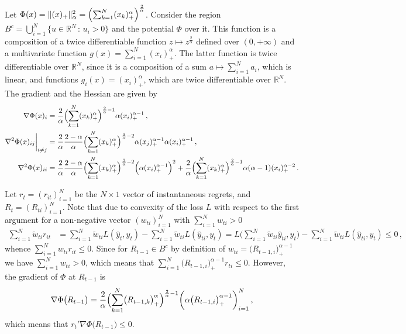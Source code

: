 \documentclass[a4paper]{article}
\newcommand{\Real}{\mathbb{R}}
\begin{document}
Let $\Phi(x) = \|(x)_+\|_\alpha^2 = \Bigl(\sum_{k=1}^N (x_k)_+^\alpha\Bigr)^\frac{2}{\alpha}$.
Consider the region $B^c=\bigcup_{i=1}^N \{u\in \Real^N\,:\, u_i > 0\}$ and the
potential $\Phi$ over it. This function is a composition of a twice differentiable
function $z\mapsto z^\frac{2}{\alpha}$ defined over $(0, +\infty)$ and a multivariate
function $g(x) = \sum_{i=1}^N (x_i)_+^\alpha$. The latter function is twice differentiable
over $\Real^N$, since it is a composition of a sum $a\mapsto \sum_{i=1}^N a_i$, which
is linear, and functions $g_i(x) = (x_i)_+^\alpha$, which are twice differentiable
over $\Real^N$. The gradient and the Hessian are given by
\begin{align*}
  \nabla \Phi(x)_i
    &= \frac{2}{\alpha}
      \Bigl(\sum_{k=1}^N (x_k)_+^\alpha\Bigr)^{\frac{2}{\alpha} - 1}
        \alpha (x_i)_+^{\alpha-1} \,, \\
  \biggl. \nabla^2 \Phi(x)_{ij} \biggr\rvert_{i\neq j}
    &= \frac{2}{\alpha}\frac{2 - \alpha}{\alpha}
      \Bigl(\sum_{k=1}^N (x_k)_+^\alpha\Bigr)^{\frac{2}{\alpha} - 2}
        \alpha (x_j)_+^{\alpha-1} \alpha (x_i)_+^{\alpha-1} \,, \\
  \nabla^2 \Phi(x)_{ii}
    &= \frac{2}{\alpha}\frac{2 - \alpha}{\alpha}
      \Bigl(\sum_{k=1}^N (x_k)_+^\alpha\Bigr)^{\frac{2}{\alpha} - 2}
        \Bigl(\alpha (x_i)_+^{\alpha-1}\Bigr)^2
    + \frac{2}{\alpha}
      \Bigl(\sum_{k=1}^N (x_k)_+^\alpha\Bigr)^{\frac{2}{\alpha} - 1}
        \alpha (\alpha - 1) (x_i)_+^{\alpha-2} \,.
\end{align*}

Let $r_t=(r_{it})_{i=1}^N$ be the $N\times 1$ vector of instantaneous regrets, and
$R_t = (R_{ti})_{i=1}^N$. Note that due to convexity of the loss $L$ with respect
to the first argument for a non-negative vector $(w_{ti})_{i=1}^N$ with $\sum_{i=1}^N w_{ti}>0$
\begin{align*}
  \sum_{i=1}^N \tilde{w}_{ti} r_{it}
    &= \sum_{i=1}^N \tilde{w}_{ti} L(\hat{y}_t, y_t)
     - \sum_{i=1}^N \tilde{w}_{ti} L(\hat{y}_{ti}, y_t)
     = L\bigl(\sum_{i=1}^N \tilde{w}_{ti} \hat{y}_{ti}, y_t\bigr)
     - \sum_{i=1}^N \tilde{w}_{ti} L(\hat{y}_{ti}, y_t)
     \leq 0 \,,
\end{align*}
whence $\sum_{i=1}^N w_{ti} r_{it} \leq 0$. Since for $R_{t-1}\in B^c$ by definition
of $w_{ti} = \bigl(R_{t-1,i}\bigr)_+^{\alpha-1}$ we have $\sum_{i=1}^N w_{ti}>0$, which
means that $\sum_{i=1}^N \bigl(R_{t-1,i}\bigr)_+^{\alpha-1} r_{ti} \leq 0$. However,
the gradient of $\Phi$ at $R_{t-1}$ is 
\begin{equation*}
  \nabla \Phi\bigl(R_{t-1}\bigr)
    = \frac{2}{\alpha} \Bigl(\sum_{k=1}^N \bigl(R_{t-1,k}\bigr)_+^\alpha\Bigr)^{\frac{2}{\alpha}-1}
      \biggl(\alpha \bigl(R_{t-1,i}\bigr)_+^{\alpha-1}\biggr)_{i=1}^N \,,
\end{equation*}
which means that $r_t' \nabla \Phi\bigl(R_{t-1}\bigr)\leq 0$.
\end{document}
